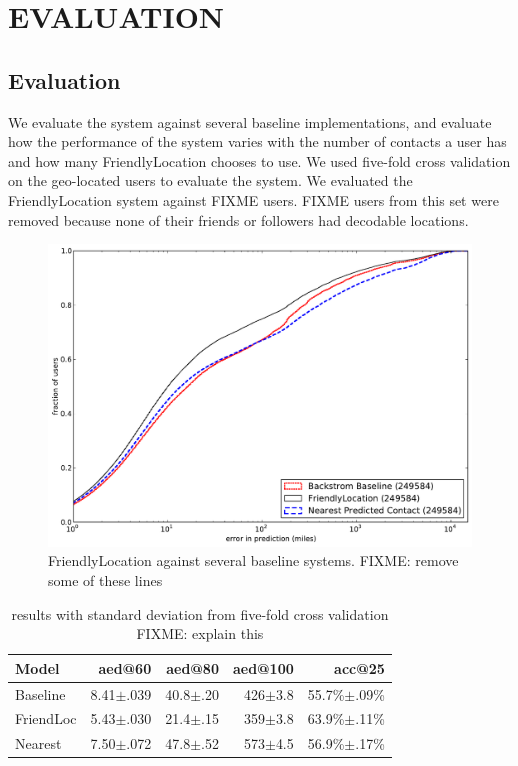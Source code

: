 \ifdefined\THESIS
    \chapter{\uppercase{Evaluation}}
\else
    \section{Evaluation}
\fi

We evaluate the system against several baseline implementations, and evaluate
how the performance of the system varies with the number of contacts a user has
and how many FriendlyLocation chooses to use.
We used five-fold cross validation on the geo-located users to evaluate the system.
We evaluated the FriendlyLocation system against FIXME users.
FIXME users from this set were removed because none of their friends or
followers had decodable locations.


\begin{figure}[tb]
\centering
\includegraphics[width=\linewidth]{figures/fl_basic.pdf}
\caption{
    FriendlyLocation against several baseline systems.
    FIXME: remove some of these lines
}
\label{fig:NearProbFit}
\end{figure}

\begin{table}[tb]
\centering
\begin{tabular}{l  r r r r}
    Model
    & aed@60
    & aed@80
    & aed@100
    & acc@25 \\
    \hline
    Baseline & 8.41$\pm$.039 & 40.8$\pm$.20 & 426$\pm$3.8 & 55.7\%$\pm$.09\% \\
    FriendLoc & 5.43$\pm$.030 & 21.4$\pm$.15 & 359$\pm$3.8 & 63.9\%$\pm$.11\% \\
    Nearest & 7.50$\pm$.072 & 47.8$\pm$.52 & 573$\pm$4.5 & 56.9\%$\pm$.17\% \\
\end{tabular}
\caption{
results with standard deviation from five-fold cross validation
FIXME: explain this
}
\label{tab:results}
\end{table}

